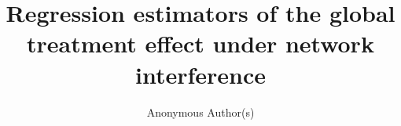 \documentclass{article}
\title{Regression estimators of the global treatment effect under network interference}
\author{Anonymous Author(s)}
\begin{document}
\maketitle

\begin{abstract}

\end{abstract}












\appendix


\clearpage

\end{document}
